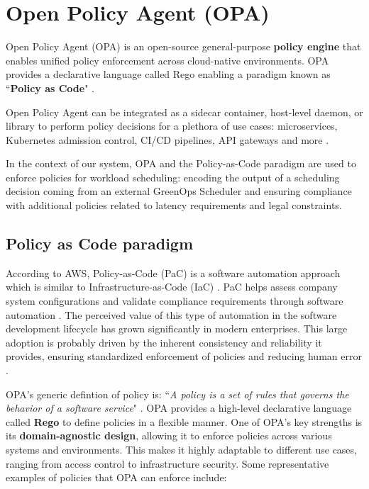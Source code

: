 \newpage

\section{Open Policy Agent (OPA)}

Open Policy Agent (OPA) is an open-source general-purpose \textbf{policy engine} that enables unified policy enforcement across cloud-native environments. OPA provides a declarative language called Rego enabling a paradigm known as ``\textbf{Policy as Code}" \cite{opa_docs}.

Open Policy Agent can be integrated as a sidecar container, host-level daemon, or library to perform policy decisions for a plethora of use cases: microservices, Kubernetes admission control, CI/CD pipelines, API gateways and more \cite{opa_docs}. 

In the context of our system, OPA and the Policy-as-Code paradigm are used to enforce policies for workload scheduling: encoding the output of a scheduling decision coming from an external GreenOps Scheduler and ensuring compliance with additional policies related to latency requirements and legal constraints.

\subsection{Policy as Code paradigm}

According to AWS, Policy-as-Code (PaC) is a software automation approach which is similar to Infrastructure-as-Code (IaC) \cite{pac_aws}. PaC helps assess company system configurations and validate compliance requirements through software automation \cite{pac_aws}. The perceived value of this type of automation in the software development lifecycle has grown significantly in modern enterprises. This large adoption is probably driven by the inherent consistency and reliability it provides, ensuring standardized enforcement of policies and reducing human error \cite{pac_aws}.

OPA's generic defintion of policy is: ``\textit{A policy is a set of rules that governs the behavior of a software service}" \cite{opa_philosophy}. OPA provides a high-level declarative language called \textbf{Rego} to define policies in a flexible manner. One of OPA's key strengths is its \textbf{domain-agnostic design}, allowing it to enforce policies across various systems and environments. This makes it highly adaptable to different use cases, ranging from access control to infrastructure security. Some representative examples of policies that OPA can enforce include:

